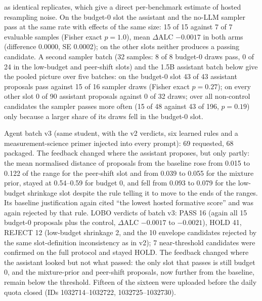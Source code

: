 \documentclass{article}
\begin{document}
as identical replicates, which give a direct per-benchmark estimate of hosted resampling noise. On the budget-0 slot the assistant and the no-LLM sampler pass at the same rate with effects of the same size: 15 of 15 against 7 of 7 evaluable samples (Fisher exact $p=1.0$), mean $\Delta\text{ALC}$ $-0.0017$ in both arms (difference $0.0000$, SE 0.0002); on the other slots neither produces a passing candidate. A second sampler batch (32 samples: 8 of 8 budget-0 draws pass, 0 of 24 in the low-budget and peer-shift slots) and the 1.5B assistant batch below give the pooled picture over five batches: on the budget-0 slot 43 of 43 assistant proposals pass against 15 of 16 sampler draws (Fisher exact $p=0.27$); on every other slot 0 of 90 assistant proposals against 0 of 32 draws; over all non-control candidates the sampler passes more often (15 of 48 against 43 of 196, $p=0.19$) only because a larger share of its draws fell in the budget-0 slot.

Agent batch v3 (same student, with the v2 verdicts, six learned rules and a measurement-science primer injected into every prompt): 69 requested, 68 packaged. The feedback changed where the assistant proposes, but only partly: the mean normalised distance of proposals from the baseline rose from 0.015 to 0.122 of the range for the peer-shift slot and from 0.039 to 0.055 for the mixture prior, stayed at 0.54--0.59 for budget 0, and fell from 0.093 to 0.079 for the low-budget shrinkage slot despite the rule telling it to move to the ends of the ranges. Its baseline justification again cited ``the lowest hosted formative score'' and was again rejected by that rule. LOBO verdicts of batch v3: PASS 16 (again all 15 budget-0 proposals plus the control, $\Delta\text{ALC}$ $-0.0017$ to $-0.0021$), HOLD 41, REJECT 12 (low-budget shrinkage 2, and the 10 envelope candidates rejected by the same slot-definition inconsistency as in v2); 7 near-threshold candidates were confirmed on the full protocol and stayed HOLD. The feedback changed where the assistant looked but not what passed: the only slot that passes is still budget 0, and the mixture-prior and peer-shift proposals, now further from the baseline, remain below the threshold. Fifteen of the sixteen were uploaded before the daily quota closed (IDs 1032714--1032722, 1032725--1032730).
\end{document}
